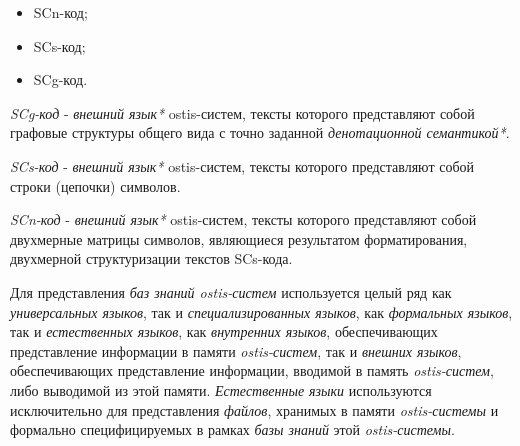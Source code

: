 \begin{itemize}
    \item SCn-код;
    \item SCs-код;
    \item SCg-код.
\end{itemize}

\textit{SCg-код} - \textit{внешний язык*} ostis-систем, тексты которого представляют собой графовые структуры общего вида с точно заданной \textit{денотационной семантикой*}.

\begin{SCn}

    \begin{scnindent}
    \end{scnindent}

\end{SCn}

\textit{SCs-код} - \textit{внешний язык*} ostis-систем, тексты которого представляют собой строки (цепочки) символов.

\begin{SCn}

    \begin{scnindent}
    \end{scnindent}

\end{SCn}

\textit{SCn-код} - \textit{внешний язык*} ostis-систем, тексты которого представляют собой двухмерные матрицы символов, являющиеся результатом форматирования, двухмерной структуризации текстов SCs-кода.

\begin{SCn}

    \begin{scnindent}
    \end{scnindent}

\end{SCn}

Для представления \textit{баз знаний ostis-систем} используется целый ряд как \textit{универсальных языков}, так и \textit{специализированных языков}, как \textit{формальных языков}, так и \textit{естественных языков}, как \textit{внутренних языков}, обеспечивающих представление информации в памяти \textit{ostis-систем}, так и \textit{внешних языков}, обеспечивающих представление информации, вводимой в память \textit{ostis-систем}, либо выводимой из этой памяти. \textit{Естественные языки} используются исключительно для представления \textit{файлов}, хранимых в памяти \textit{ostis-системы} и формально специфицируемых в рамках \textit{базы знаний} этой \textit{ostis-системы}.

